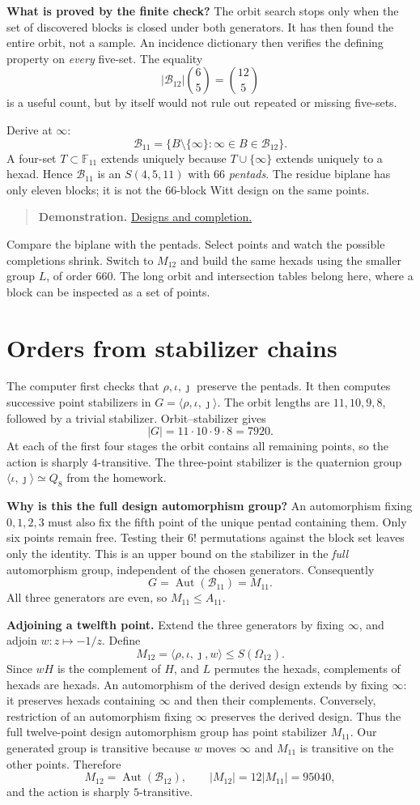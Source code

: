 \documentclass[12pt,letterpaper]{article}
\theoremstyle{definition}
\theoremstyle{remark}
\newenvironment{toolnote}{\begin{quote}\small\color{navy}}{\end{quote}}
\newcommand{\F}{\mathbb F}\newcommand{\Z}{\mathbb Z}
\DeclareMathOperator{\Aut}{Aut}\DeclareMathOperator{\Hom}{Hom}
\newcommand{\pageheading}[1]{\clearpage\section{#1}}
\newcommand{\demolink}[2]{\href{https://gtevelev-max.github.io/mathieu/\##1}{#2}}
\newcommand{\demobox}[2]{\begin{toolnote}\textbf{Demonstration.} \demolink{#1}{#2}\end{toolnote}}
\begin{document}
\textbf{What is proved by the finite check?} The orbit search stops only when the set of discovered blocks is closed under both generators. It has then found the entire orbit, not a sample. An incidence dictionary then verifies the defining property on \emph{every} five-set. The equality
\[
 |\mathcal B_{12}|\binom65=\binom{12}{5}
\]
is a useful count, but by itself would not rule out repeated or missing five-sets.

Derive at $\infty$:
\[
 \mathcal B_{11}=\{B\setminus\{\infty\}:\infty\in B\in\mathcal B_{12}\}.
\]
A four-set $T\subset\F_{11}$ extends uniquely because $T\cup\{\infty\}$ extends uniquely to a hexad. Hence $\mathcal B_{11}$ is an $S(4,5,11)$ with 66 \emph{pentads}. The residue biplane has only eleven blocks; it is not the 66-block Witt design on the same points.

\demobox{designs?group=11}{Designs and completion.} Compare the biplane with the pentads. Select points and watch the possible completions shrink. Switch to $M_{12}$ and build the same hexads using the smaller group $L$, of order 660. The long orbit and intersection tables belong here, where a block can be inspected as a set of points.

\hypertarget{orders}{}
\pageheading{Orders from stabilizer chains}
The computer first checks that $\rho,\iota,\jmath$ preserve the pentads. It then computes successive point stabilizers in $G=\langle\rho,\iota,\jmath\rangle$. The orbit lengths are $11,10,9,8$, followed by a trivial stabilizer. Orbit--stabilizer gives
\[
 |G|=11\cdot10\cdot9\cdot8=7920.
\]
At each of the first four stages the orbit contains all remaining points, so the action is sharply $4$-transitive. The three-point stabilizer is the quaternion group $\langle\iota,\jmath\rangle\simeq Q_8$ from the homework.

\textbf{Why is this the full design automorphism group?} An automorphism fixing $0,1,2,3$ must also fix the fifth point of the unique pentad containing them. Only six points remain free. Testing their $6!$ permutations against the block set leaves only the identity. This is an upper bound on the stabilizer in the \emph{full} automorphism group, independent of the chosen generators. Consequently
\[
 G=\Aut(\mathcal B_{11})=M_{11}.
\]
All three generators are even, so $M_{11}\le A_{11}$.

\textbf{Adjoining a twelfth point.} Extend the three generators by fixing $\infty$, and adjoin $w:z\mapsto-1/z$. Define
\[
 M_{12}=\langle\rho,\iota,\jmath,w\rangle\le S(\Omega_{12}).
\]
Since $wH$ is the complement of $H$, and $L$ permutes the hexads, complements of hexads are hexads. An automorphism of the derived design extends by fixing $\infty$: it preserves hexads containing $\infty$ and then their complements. Conversely, restriction of an automorphism fixing $\infty$ preserves the derived design. Thus the full twelve-point design automorphism group has point stabilizer $M_{11}$. Our generated group is transitive because $w$ moves $\infty$ and $M_{11}$ is transitive on the other points. Therefore
\[
 M_{12}=\Aut(\mathcal B_{12}),\qquad |M_{12}|=12|M_{11}|=95040,
\]
and the action is sharply $5$-transitive.
\end{document}
